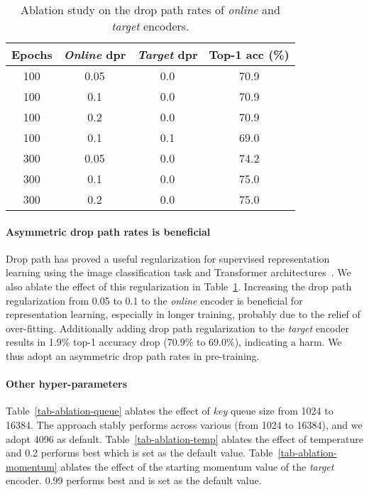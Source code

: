 \documentclass{article}
\begin{document}
\begin{table}[h]
  \centering
  \begin{tabular}{cccc}
    \toprule
    Epochs & \emph{Online} dpr & \emph{Target} dpr & Top-1 acc (\%) \\
    \midrule
    100 & 0.05 & 0.0 & 70.9 \\
    100 & 0.1  & 0.0 & 70.9 \\
    100 & 0.2  & 0.0 & 70.9 \\
    100 & 0.1  & 0.1 & 69.0 \\
    \midrule
    300 & 0.05 & 0.0 & 74.2 \\
    300 & 0.1  & 0.0 & 75.0 \\
    300 & 0.2  & 0.0 & 75.0 \\
    \bottomrule
  \end{tabular}
  \caption{Ablation study on the drop path rates of \emph{online} and \emph{target} encoders.}
  \label{tab-ablation-droppath}
\end{table}

\paragraph{Asymmetric drop path rates is beneficial} Drop path has proved a useful regularization for supervised representation learning using the image classification task and Transformer architectures~\citep{deit,swin}. We also ablate the effect of this regularization in Table~\ref{tab-ablation-droppath}. Increasing the drop path regularization from 0.05 to 0.1 to the \emph{online} encoder is beneficial for representation learning, especially in longer training, probably due to the relief of over-fitting. Additionally adding drop path regularization to the \emph{target} encoder results in 1.9\% top-1 accuracy drop (70.9\% to 69.0\%), indicating a harm. We thus adopt an asymmetric drop path rates in pre-training.

\paragraph{Other hyper-parameters} Table~\ref{tab-ablation-queue} ablates the effect of \emph{key} queue size  from 1024 to 16384. The approach stably performs across various  (from 1024 to 16384), and we adopt 4096 as default.
Table~\ref{tab-ablation-temp} ablates the effect of temperature  and 0.2 performs best which is set as the default value.
Table~\ref{tab-ablation-momentum} ablates the effect of the starting momentum value of the \emph{target} encoder. 0.99 performs best and is set as the default value.
\end{document}
